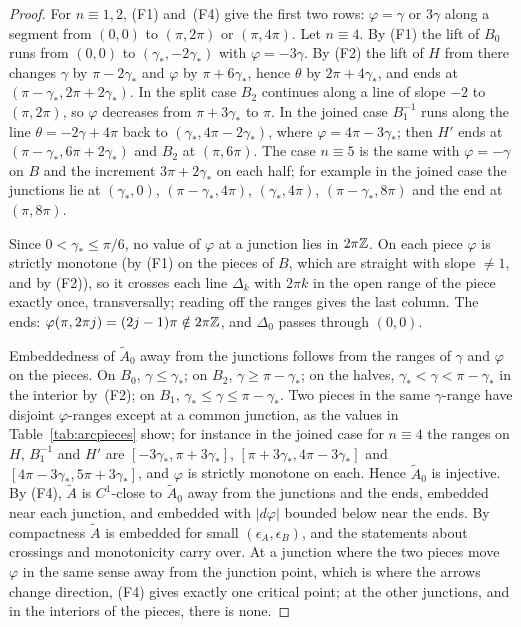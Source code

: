 \begin{proof}
For $n\equiv1,2$, (F1) and~(F4) give the first two rows: $\varphi=\gamma$ or $3\gamma$ along a segment from $(0,0)$ to
$(\pi,2\pi)$ or $(\pi,4\pi)$. Let $n\equiv4$. By (F1) the lift of $B_0$ runs from $(0,0)$ to $(\gamma_*,-2\gamma_*)$
with $\varphi=-3\gamma$. By (F2) the lift of $H$ from there changes $\gamma$ by $\pi-2\gamma_*$ and $\varphi$ by $\pi+6\gamma_*$,
hence $\theta$ by $2\pi+4\gamma_*$, and ends at $(\pi-\gamma_*,2\pi+2\gamma_*)$. In the split case $B_2$ continues
along a line of slope $-2$ to $(\pi,2\pi)$, so $\varphi$ decreases from $\pi+3\gamma_*$ to $\pi$. In the joined case
$B_1^{-1}$ runs along the line $\theta=-2\gamma+4\pi$ back to $(\gamma_*,4\pi-2\gamma_*)$, where $\varphi=4\pi-3\gamma_*$;
then $H'$ ends at $(\pi-\gamma_*,6\pi+2\gamma_*)$ and $B_2$ at $(\pi,6\pi)$. The case $n\equiv5$ is the same with
$\varphi=-\gamma$ on $B$ and the increment $3\pi+2\gamma_*$ on each half; for example in the joined case the
junctions lie at $(\gamma_*,0)$, $(\pi-\gamma_*,4\pi)$, $(\gamma_*,4\pi)$, $(\pi-\gamma_*,8\pi)$ and the end at $(\pi,8\pi)$.

Since $0<\gamma_*\le\pi/6$, no value of $\varphi$ at a junction lies in $2\pi\mathbb{Z}$. On each piece $\varphi$ is strictly
monotone (by (F1) on the pieces of $B$, which are straight with slope $\neq1$, and by (F2)), so it crosses each
line $\Delta_k$ with $2\pi k$ in the open range of the piece exactly once, transversally; reading off the ranges
gives the last column. The ends: $\varphi(\pi,2\pi j)=(2j-1)\pi\notin2\pi\mathbb{Z}$, and $\Delta_0$ passes through $(0,0)$.

Embeddedness of $\tilde A_0$ away from the junctions follows from the ranges of $\gamma$ and $\varphi$ on the
pieces. On $B_0$, $\gamma\le\gamma_*$; on $B_2$, $\gamma\ge\pi-\gamma_*$; on the halves, $\gamma_*<\gamma<\pi-\gamma_*$ in the interior
by~(F2); on $B_1$, $\gamma_*\le\gamma\le\pi-\gamma_*$. Two pieces in the same $\gamma$-range have disjoint $\varphi$-ranges except
at a common junction, as the values in Table~\ref{tab:arcpieces} show; for instance in the joined case for $n\equiv4$ the
ranges on $H$, $B_1^{-1}$ and $H'$ are $[-3\gamma_*,\pi+3\gamma_*]$, $[\pi+3\gamma_*,4\pi-3\gamma_*]$ and
$[4\pi-3\gamma_*,5\pi+3\gamma_*]$, and $\varphi$ is strictly monotone on each. Hence $\tilde A_0$ is injective. By (F4), $\tilde A$ is
$C^1$-close to $\tilde A_0$ away from the junctions and the ends, embedded near each junction, and embedded with
$|d\varphi|$ bounded below near the ends. By compactness $\tilde A$ is embedded for small $(\epsilon_A,\epsilon_B)$, and the
statements about crossings and monotonicity carry over. At a junction where the two pieces move $\varphi$ in
the same sense away from the junction point, which is where the arrows change direction, (F4) gives exactly
one critical point; at the other junctions, and in the interiors of the pieces, there is none.
\end{proof}

